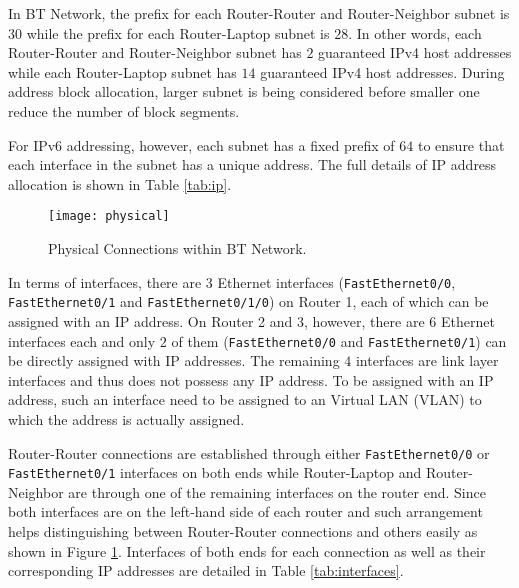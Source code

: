 In BT Network, the prefix for each Router-Router and Router-Neighbor subnet is $30$ while the prefix for each Router-Laptop subnet is $28$. In other words, each Router-Router and Router-Neighbor subnet has $2$ guaranteed IPv4 host addresses while each Router-Laptop subnet has $14$ guaranteed IPv4 host addresses. During address block allocation, larger subnet is being considered before smaller one reduce the number of block segments.

For IPv6 addressing, however, each subnet has a fixed prefix of $64$ to ensure that each interface in the subnet has a unique address. The full details of IP address allocation is shown in Table \ref{tab:ip}.

\begin{figure}[ht!]
    \centering
    \texttt{[image: physical]}
    \caption{Physical Connections within BT Network.}
    \label{fig:physical}
\end{figure}

In terms of interfaces, there are $3$ Ethernet interfaces (\texttt{FastEthernet0/0}, \texttt{FastEthernet0/1} and \texttt{FastEthernet0/1/0}) on Router 1, each of which can be assigned with an IP address. On Router 2 and 3, however, there are $6$ Ethernet interfaces each and only $2$ of them (\texttt{FastEthernet0/0} and \texttt{FastEthernet0/1}) can be directly assigned with IP addresses. 
The remaining $4$ interfaces are link layer interfaces and thus does not possess any IP address.
To be assigned with an IP address, such an interface need to be assigned to an Virtual LAN (VLAN) to which the address is actually assigned.

Router-Router connections are established through either \texttt{FastEthernet0/0} or \texttt{FastEthernet0/1} interfaces on both ends while Router-Laptop and Router-Neighbor are through one of the remaining interfaces on the router end.
Since both interfaces are on the left-hand side of each router and such arrangement helps distinguishing between Router-Router connections and others easily as shown in Figure \ref{fig:physical}. Interfaces of both ends for each connection as well as their corresponding IP addresses are detailed in Table \ref{tab:interfaces}.

